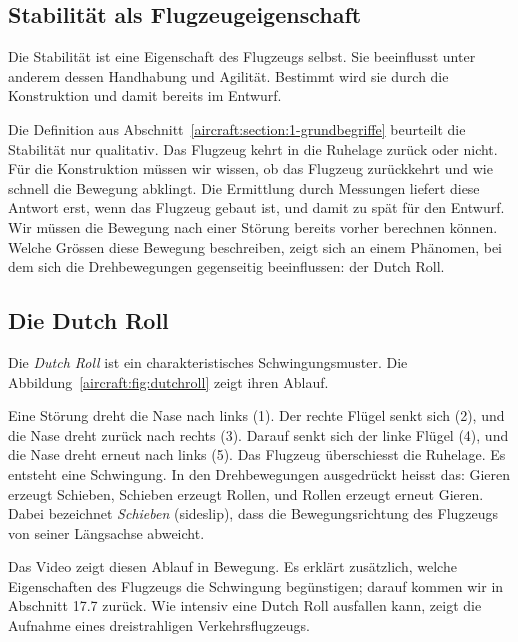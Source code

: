 \subsection{Stabilität als Flugzeugeigenschaft
\label{aircraft:subsection:eigenschaft}}
Die Stabilität ist eine Eigenschaft des Flugzeugs selbst.
Sie beeinflusst unter anderem dessen Handhabung und Agilität.
Bestimmt wird sie durch die Konstruktion und damit bereits im Entwurf.

Die Definition aus Abschnitt~\ref{aircraft:section:1-grundbegriffe}
beurteilt die Stabilität nur qualitativ.
Das Flugzeug kehrt in die Ruhelage zurück oder nicht.
Für die Konstruktion müssen wir wissen, ob das Flugzeug zurückkehrt und wie
schnell die Bewegung abklingt.
Die Ermittlung durch Messungen liefert diese Antwort erst, wenn das
Flugzeug gebaut ist, und damit zu spät für den Entwurf.
Wir müssen die Bewegung nach einer Störung bereits vorher berechnen können.
Welche Grössen diese Bewegung beschreiben, zeigt sich an einem Phänomen,
bei dem sich die Drehbewegungen gegenseitig beeinflussen: der Dutch Roll.
%

\subsection{Die Dutch Roll
\label{aircraft:subsection:dutchroll}}
Die \emph{Dutch Roll} ist ein charakteristisches Schwingungsmuster.
Die Abbildung~\ref{aircraft:fig:dutchroll} zeigt ihren Ablauf.

Eine Störung dreht die Nase nach links (1).
Der rechte Flügel senkt sich (2), und die Nase dreht zurück nach
rechts (3).
Darauf senkt sich der linke Flügel (4), und die Nase dreht erneut
nach links (5).
Das Flugzeug überschiesst die Ruhelage.
Es entsteht eine Schwingung.
In den Drehbewegungen ausgedrückt heisst das:
Gieren erzeugt Schieben, Schieben erzeugt Rollen, und Rollen erzeugt
erneut Gieren.
Dabei bezeichnet \emph{Schieben} (sideslip), dass die Bewegungsrichtung des
Flugzeugs von seiner Längsachse abweicht.


\phantom{000}Das Video \cite{aircraft:video-erklaerung} zeigt diesen Ablauf in Bewegung.
Es erklärt zusätzlich, welche Eigenschaften des Flugzeugs die Schwingung
begünstigen; darauf kommen wir in Abschnitt 17.7 zurück.
%
%
Wie intensiv eine Dutch Roll ausfallen kann, zeigt die Aufnahme
\cite{aircraft:video-aufnahme} eines dreistrahligen Verkehrsflugzeugs.


